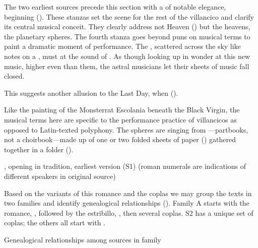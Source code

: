 The two earliest sources precede this section with a  of notable
elegance, beginning 
().
These stanzas set the scene for the rest of the villancico and clarify its
central musical conceit.
They clearly address not Heaven () but the heavens, the
planetary spheres.
The fourth stanza goes beyond puns on musical terms to paint a dramatic moment
of performance.
The , scattered across the sky like notes on a , must  at the sound of .
As though looking up in wonder at this new music, higher even than them, the
astral musicians let their sheets of music fall closed.%
\begin{Footnote}
    This suggests another allusion to the Last Day, when  ().
\end{Footnote}
Like the painting of the Monsterrat Escolania beneath the Black Virgin, the
musical terms here are specific to the performance practice of villancicos as
opposed to Latin-texted polyphony.
The spheres are singing from ---partbooks, not a
choirbook---made up of one or two folded sheets of paper () gathered together in a folder ().

{, opening  in  tradition, earliest version (S1) (roman numerals are indications of
different speakers in original source)}

Based on the variants of this romance and the coplas we may group the
texts in two families and identify genealogical relationships
().
Family A starts with the romance, ,
followed by the estribillo, ,
then several coplas.
S2 has a unique set of coplas; the others all start with .

{Genealogical relationships among sources in  family}

